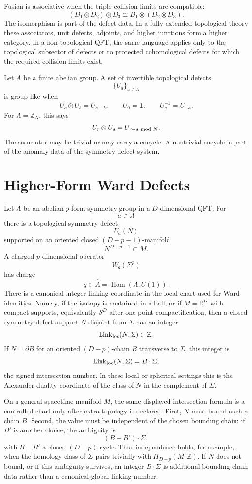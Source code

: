Fusion is associative when the triple-collision limits are compatible:
\[
  (D_1\otimes D_2)\otimes D_3
  \cong
  D_1\otimes(D_2\otimes D_3).
\]
The isomorphism is part of the defect data.  In a fully extended topological
theory these associators, unit defects, adjoints, and higher junctions form a
higher category.  In a non-topological QFT, the same language applies only to
the topological subsector of defects or to protected cohomological defects
for which the required collision limits exist.

\begin{example}
\label{ex:group-like-topological-defects}
Let \(A\) be a finite abelian group.  A set of invertible topological defects
\[
  \{U_a\}_{a\in A}
\]
is group-like when
\[
  U_a\otimes U_b=U_{a+b},
  \qquad
  U_0=\mathbf 1,
  \qquad
  U_a^{-1}=U_{-a}.
\]
For \(A=\mathbb Z_N\), this says
\[
  U_r\otimes U_s=U_{r+s\ {\rm mod}\ N}.
\]
The associator may be trivial or may carry a cocycle.  A nontrivial cocycle
is part of the anomaly data of the symmetry-defect system.
\end{example}

\section{Higher-Form Ward Defects}

Let \(A\) be an abelian \(p\)-form symmetry group in a \(D\)-dimensional QFT.
For
\[
  a\in A
\]
there is a topological symmetry defect
\[
  U_a(N)
\]
supported on an oriented closed \((D-p-1)\)-manifold
\[
  N^{D-p-1}\subset M .
\]
A charged \(p\)-dimensional operator
\[
  W_q(\Sigma^p)
\]
has charge
\[
  q\in\widehat A=\operatorname{Hom}(A,U(1)).
\]
There is a canonical integer linking coordinate in the local chart used for
Ward identities.  Namely, if the isotopy is contained in a ball, or if
\(M=\mathbb R^D\) with compact supports, equivalently \(S^D\) after
one-point compactification, then a closed symmetry-defect support \(N\)
disjoint from \(\Sigma\) has an integer
\[
  \operatorname{Link}_{\rm loc}(N,\Sigma)\in\mathbb Z .
\]
If \(N=\partial B\) for an oriented \((D-p)\)-chain \(B\) transverse to
\(\Sigma\), this integer is
\[
  \operatorname{Link}_{\rm loc}(N,\Sigma)=B\cdot\Sigma ,
\]
the signed intersection number.  In these local or spherical settings this is
the Alexander-duality coordinate of the class of \(N\) in the complement of
\(\Sigma\).

On a general spacetime manifold \(M\), the same displayed intersection formula
is a controlled chart only after extra topology is declared.  First,
\(N\) must bound such a chain \(B\).  Second, the value must be independent of
the chosen bounding chain: if \(B'\) is another choice, the ambiguity is
\[
  (B-B')\cdot\Sigma ,
\]
with \(B-B'\) a closed \((D-p)\)-cycle.  Thus independence holds, for example,
when the homology class of \(\Sigma\) pairs trivially with
\(H_{D-p}(M;\mathbb Z)\).  If \(N\) does not bound, or if this ambiguity
survives, an integer \(B\cdot\Sigma\) is additional bounding-chain data rather
than a canonical global linking number.

